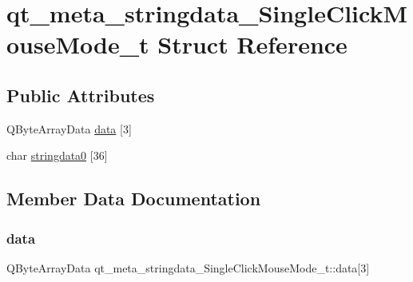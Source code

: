 \hypertarget{structqt__meta__stringdata___single_click_mouse_mode__t}{}\section{qt\+\_\+meta\+\_\+stringdata\+\_\+\+Single\+Click\+Mouse\+Mode\+\_\+t Struct Reference}
\label{structqt__meta__stringdata___single_click_mouse_mode__t}
\subsection*{Public Attributes}
\begin{DoxyCompactItemize}
\item 
Q\+Byte\+Array\+Data \mbox{\hyperlink{structqt__meta__stringdata___single_click_mouse_mode__t_a857a2ba61eec49b450c02db415e60ff0}{data}} \mbox{[}3\mbox{]}
\item 
char \mbox{\hyperlink{structqt__meta__stringdata___single_click_mouse_mode__t_ada9ed0c9279c81044b565db31a50d568}{stringdata0}} \mbox{[}36\mbox{]}
\end{DoxyCompactItemize}


\subsection{Member Data Documentation}
\mbox{\label{structqt__meta__stringdata___single_click_mouse_mode__t_a857a2ba61eec49b450c02db415e60ff0}} 
\subsubsection{\texorpdfstring{data}{data}}
{\footnotesize\ttfamily Q\+Byte\+Array\+Data qt\+\_\+meta\+\_\+stringdata\+\_\+\+Single\+Click\+Mouse\+Mode\+\_\+t\+::data\mbox{[}3\mbox{]}}

\mbox{\label{structqt__meta__stringdata___single_click_mouse_mode__t_ada9ed0c9279c81044b565db31a50d568}} 
